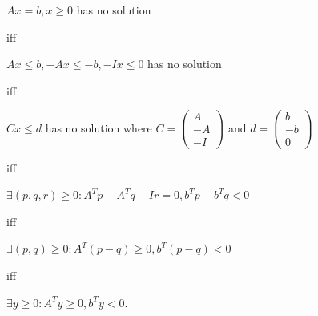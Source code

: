 \documentclass[12pt]{article}
\begin{document}
\begin{enumerate}
\begin{center}
$Ax=b, x\geq 0$ has no solution

iff

$Ax\leq b, -Ax \leq -b, -Ix\leq 0$ has no solution 

iff

$Cx\leq d$ has no solution where $C=\left(\begin{array}{c}A \\ -A
    \\ -I\end{array} \right)$ and $d=\left(\begin{array}{c}b \\ -b
    \\ 0\end{array} \right)$

iff

$\exists (p,q,r)\geq 0: A^Tp-A^Tq-Ir=0, b^Tp-b^Tq<0$

iff

$\exists (p,q)\geq 0: A^T(p-q)\geq 0, b^T(p-q)<0$

iff

$\exists y \geq 0: A^Ty\geq 0, b^Ty <0$.
\end{center}


\end{enumerate}
\end{document}
